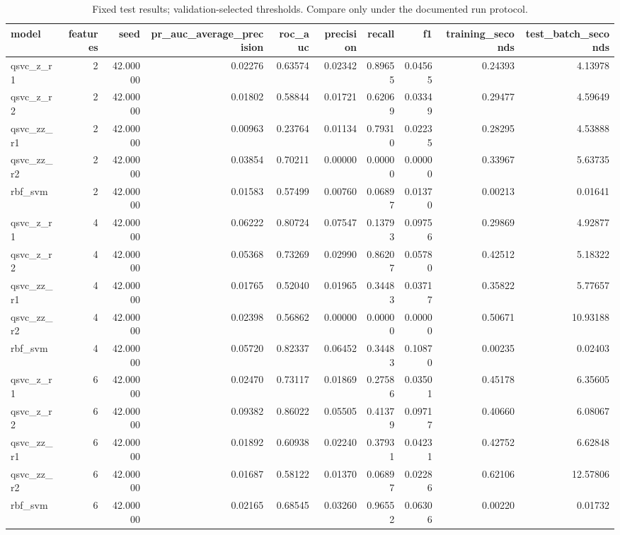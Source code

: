\begin{table}
\caption{Fixed test results; validation-selected thresholds. Compare only under the documented run protocol.}
\begin{tabular}{lrrrrrrrrr}
\toprule
model & features & seed & pr\_auc\_average\_precision & roc\_auc & precision & recall & f1 & training\_seconds & test\_batch\_seconds \\
\midrule
qsvc\_z\_r1 & 2 & 42.00000 & 0.02276 & 0.63574 & 0.02342 & 0.89655 & 0.04565 & 0.24393 & 4.13978 \\
qsvc\_z\_r2 & 2 & 42.00000 & 0.01802 & 0.58844 & 0.01721 & 0.62069 & 0.03349 & 0.29477 & 4.59649 \\
qsvc\_zz\_r1 & 2 & 42.00000 & 0.00963 & 0.23764 & 0.01134 & 0.79310 & 0.02235 & 0.28295 & 4.53888 \\
qsvc\_zz\_r2 & 2 & 42.00000 & 0.03854 & 0.70211 & 0.00000 & 0.00000 & 0.00000 & 0.33967 & 5.63735 \\
rbf\_svm & 2 & 42.00000 & 0.01583 & 0.57499 & 0.00760 & 0.06897 & 0.01370 & 0.00213 & 0.01641 \\
qsvc\_z\_r1 & 4 & 42.00000 & 0.06222 & 0.80724 & 0.07547 & 0.13793 & 0.09756 & 0.29869 & 4.92877 \\
qsvc\_z\_r2 & 4 & 42.00000 & 0.05368 & 0.73269 & 0.02990 & 0.86207 & 0.05780 & 0.42512 & 5.18322 \\
qsvc\_zz\_r1 & 4 & 42.00000 & 0.01765 & 0.52040 & 0.01965 & 0.34483 & 0.03717 & 0.35822 & 5.77657 \\
qsvc\_zz\_r2 & 4 & 42.00000 & 0.02398 & 0.56862 & 0.00000 & 0.00000 & 0.00000 & 0.50671 & 10.93188 \\
rbf\_svm & 4 & 42.00000 & 0.05720 & 0.82337 & 0.06452 & 0.34483 & 0.10870 & 0.00235 & 0.02403 \\
qsvc\_z\_r1 & 6 & 42.00000 & 0.02470 & 0.73117 & 0.01869 & 0.27586 & 0.03501 & 0.45178 & 6.35605 \\
qsvc\_z\_r2 & 6 & 42.00000 & 0.09382 & 0.86022 & 0.05505 & 0.41379 & 0.09717 & 0.40660 & 6.08067 \\
qsvc\_zz\_r1 & 6 & 42.00000 & 0.01892 & 0.60938 & 0.02240 & 0.37931 & 0.04231 & 0.42752 & 6.62848 \\
qsvc\_zz\_r2 & 6 & 42.00000 & 0.01687 & 0.58122 & 0.01370 & 0.06897 & 0.02286 & 0.62106 & 12.57806 \\
rbf\_svm & 6 & 42.00000 & 0.02165 & 0.68545 & 0.03260 & 0.96552 & 0.06306 & 0.00220 & 0.01732 \\
\bottomrule
\end{tabular}
\end{table}
